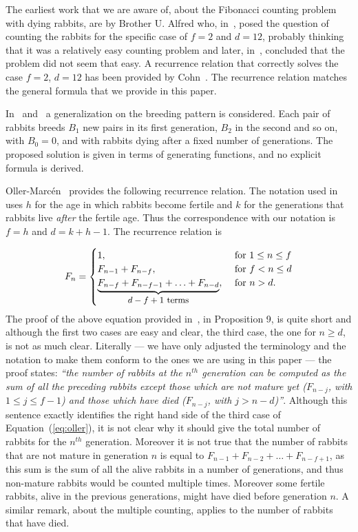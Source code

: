 \documentclass[11pt,epsf]{article}
\newcommand{\cfor}{{\text{ for }}}
\begin{document}
The earliest work that we are aware of, about the Fibonacci counting problem with dying rabbits, 
are by Brother U. Alfred who, in~\cite{A1963-1}, posed the question of counting the rabbits
for the specific case of $f=2$ and $d=12$, probably thinking that it was a relatively easy counting problem
and later, in~\cite{A1963-4}, concluded that the problem did not seem that easy. 
A recurrence relation that correctly solves the case $f=2$, $d=12$ has been provided by Cohn~\cite{C1964}.
The recurrence relation matches the general formula that we provide in this paper.

In~\cite{H1968} and~\cite{HL1969} a generalization on
the breeding pattern is considered. Each pair of rabbits breeds $B_1$ new pairs in its first generation,
$B_2$ in the second and so on, with $B_0=0$, and with rabbits dying after a fixed number
of generations. The proposed solution is given in terms of generating functions, and no
explicit formula is derived.

Oller-Marcén~\cite{O2009} provides the following recurrence relation.
The notation
used in~\cite{O2009} uses $h$ for the age in which rabbits become fertile and $k$ for the generations
that rabbits live {\em after} the fertile age. Thus the correspondence with our notation is $f=h$ and $d=k+h-1$.
The recurrence relation is

\begin{equation}\label{eq:oller}
F_n = 
\begin{cases}
1,                                                       & \cfor 1\le n\le f\\
F_{n-1}+F_{n-f},                                & \cfor f < n \le d\\
\underbrace{F_{n-f}+F_{n-f-1}+\ldots+F_{n-d}}_{\makebox{{\small $d-f+1$ terms}}}, & \cfor n > d.
\end{cases}
\end{equation}
The proof of the above equation provided in~\cite{O2009}, in Proposition 9, is quite short and although the first two cases
are easy and clear, the third case, the one for $n\ge d$, is not as much clear.
Literally --- we have only adjusted
the terminology and the notation to make them conform to the ones we are using in this paper --- the proof states:
{\em ``the number of rabbits at the $n^{th}$ generation can be computed as the sum of all the preceding
rabbits except those which are not mature yet ($F_{n-j}$, with $1\le j \le f-1$) and those which 
have died ($F_{n-j}$, with $j>n-d$)''}. Although this sentence exactly identifies the right hand side of
the third case of Equation~(\ref{eq:oller}), it is not clear why it should give the total number of rabbits for
the $n^{th}$ generation. Moreover it is not true that the number of rabbits that are not mature in generation $n$ is equal
to $F_{n-1}+F_{n-2}+\ldots+F_{n-f+1}$, as this sum is the sum of all the alive rabbits in a number of generations, and thus 
non-mature rabbits would be counted multiple times. Moreover some fertile rabbits, alive in the previous generations, might have died before generation $n$. 
A similar remark, about the multiple counting, applies to the number of rabbits that have died.
\end{document}
